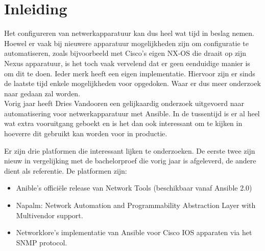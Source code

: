 
\chapter{Inleiding}
\label{ch:inleiding}
Het configureren van netwerkapparatuur kan dus heel wat tijd in beslag nemen. Hoewel er vaak bij nieuwere apparatuur mogelijkheden zijn om configuratie te automatiseren, zoals bijvoorbeeld met Cisco's eigen NX-OS die draait op zijn Nexus apparatuur, is het toch vaak vervelend dat er geen eenduidige manier is om dit te doen. \autocite{ciscoNxosPDF} Ieder merk heeft een eigen implementatie. Hiervoor zijn er sinds de laatste tijd enkele mogelijkheden voor opgedoken. Waar er dus meer onderzoek naar gedaan zal worden.
\\

Vorig jaar heeft Dries Vandooren een gelijkaardig onderzoek uitgevoerd naar automatisering voor netwerkapparatuur met Ansible. In de tussentijd is er al heel wat extra vooruitgang geboekt en is het dan ook interessant om te kijken in hoeverre dit gebruikt kan worden voor in productie.

Er zijn drie platformen die interessant lijken te onderzoeken. De eerste twee zijn  nieuw in vergelijking met de bachelorproef die vorig jaar is afgeleverd, de andere dient als referentie. De platformen zijn: 
\begin{itemize}
\item Anible's officiële release van Network Tools (beschikbaar vanaf Ansible 2.0)
\item Napalm: Network Automation and Programmability Abstraction Layer with Multivendor support.
\item Networklore's implementatie van Ansible voor Cisco IOS apparaten via het SNMP protocol.
\\
\end{itemize}



